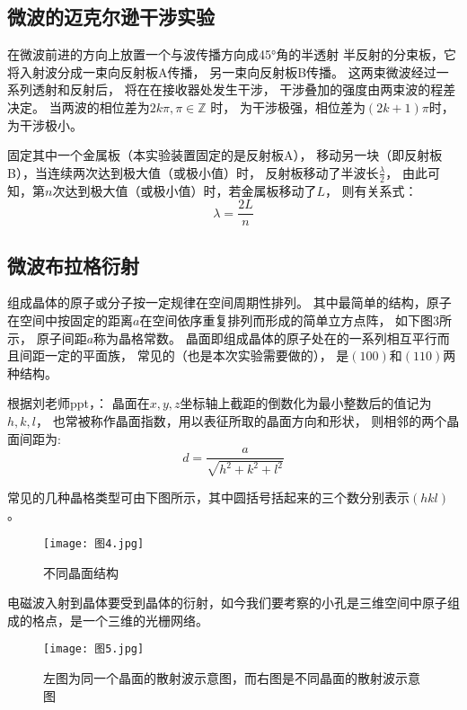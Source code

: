 \documentclass[11pt]{article}
\begin{document}
\subsection{微波的迈克尔逊干涉实验}

在微波前进的方向上放置一个与波传播方向成45°角的半透射
半反射的分束板，它将入射波分成一束向反射板A传播，
另一束向反射板B传播。
这两束微波经过一系列透射和反射后，
将在在接收器处发生干涉，
干涉叠加的强度由两束波的程差决定。
当两波的相位差为$2k\pi,\pi\in\mathbb{Z}$ 时，
为干涉极强，相位差为$(2k+1)\pi$时，为干涉极小。

固定其中一个金属板（本实验装置固定的是反射板A），
移动另一块（即反射板B），当连续两次达到极大值（或极小值）时，
反射板移动了半波长$\displaystyle\frac{\lambda}{2}$，
由此可知，第$n$次达到极大值（或极小值）时，若金属板移动了$L$，
则有关系式：
\begin{displaymath}\lambda=\frac{2L}{n}\end{displaymath}


\subsection{微波布拉格衍射}

组成晶体的原子或分子按一定规律在空间周期性排列。
其中最简单的结构，原子在空间中按固定的距离$a$在空间依序重复排列而形成的简单立方点阵，
如下图3所示，
原子间距$a$称为晶格常数。
晶面即组成晶体的原子处在的一系列相互平行而且间距一定的平面族，
常见的（也是本次实验需要做的），
是$(100)$和$(110)$两种结构。

根据刘老师ppt，：
晶面在$x,y,z$坐标轴上截距的倒数化为最小整数后的值记为$h,k,l$，
也常被称作晶面指数，用以表征所取的晶面方向和形状，
则相邻的两个晶面间距为:
\begin{displaymath}d=\frac{a}{\sqrt{h^2+k^2+l^2}}\end{displaymath}

常见的几种晶格类型可由下图所示，其中圆括号括起来的三个数分别表示$(hkl)$。
\begin{figure}[H]
    \centering
    \texttt{[image: 图4.jpg]}
    \caption{不同晶面结构}
\end{figure}

电磁波入射到晶体要受到晶体的衍射，如今我们要考察的小孔是三维空间中原子组成的格点，是一个三维的光栅网络。

\begin{figure}[H]
    \centering
    \texttt{[image: 图5.jpg]}
    \caption{左图为同一个晶面的散射波示意图，而右图是不同晶面的散射波示意图}
\end{figure}
\end{document}
